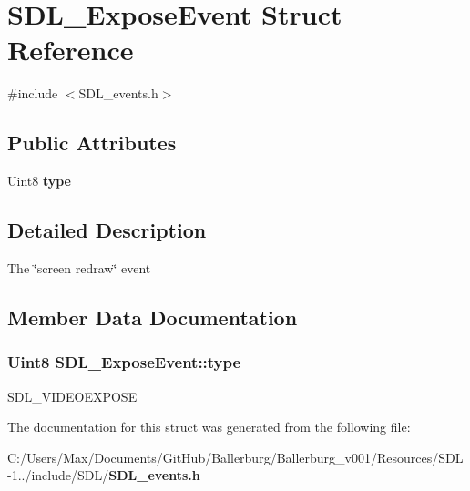 \section{S\+D\+L\+\_\+\+Expose\+Event Struct Reference}
\label{struct_s_d_l___expose_event}


{\ttfamily \#include $<$S\+D\+L\+\_\+events.\+h$>$}

\subsection*{Public Attributes}
\begin{DoxyCompactItemize}
\item 
Uint8 {\bf type}
\end{DoxyCompactItemize}


\subsection{Detailed Description}
The \char`\"{}screen redraw\char`\"{} event 

\subsection{Member Data Documentation}
\subsubsection[{type}]{\setlength{\rightskip}{0pt plus 5cm}Uint8 S\+D\+L\+\_\+\+Expose\+Event\+::type}\label{struct_s_d_l___expose_event_a3d6e2c14e4492130733e055b6db0c8c8}
S\+D\+L\+\_\+\+V\+I\+D\+E\+O\+E\+X\+P\+O\+S\+E 

The documentation for this struct was generated from the following file\+:\begin{DoxyCompactItemize}
\item 
C\+:/\+Users/\+Max/\+Documents/\+Git\+Hub/\+Ballerburg/\+Ballerburg\+\_\+v001/\+Resources/\+S\+D\+L-\/1../include/\+S\+D\+L/{\bf S\+D\+L\+\_\+events.\+h}\end{DoxyCompactItemize}
